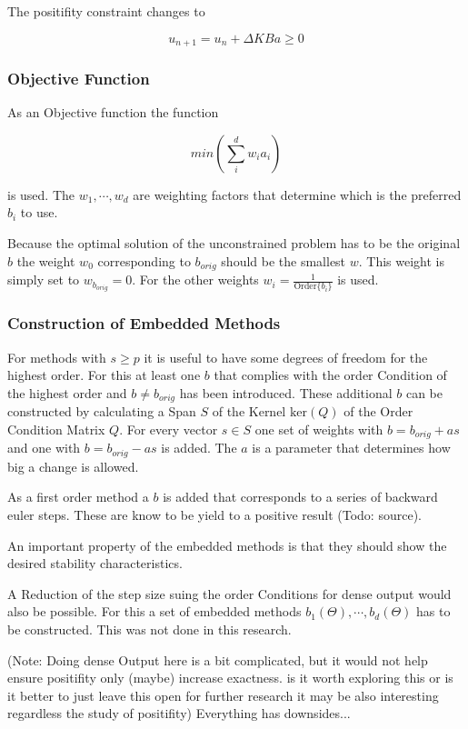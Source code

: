 \documentclass{article}
\begin{document}
The positifity constraint changes to 

$$u_{n+1}=u_n+\Delta K B a \geq 0$$


\subsubsection{Objective Function}

As an Objective function the function

$$ min \left(\sum_i^d w_i a_i \right) $$

is used.  The $w_1,\cdots,w_d$ are weighting factors that determine which is the preferred $b_i$ to use.

Because the optimal solution of the unconstrained problem has to be the original $b$ the weight $w_0$ corresponding to $b_{orig}$ should be the smallest $w$. This weight is simply set to $w_{b_{orig}} = 0$. For the other weights $w_i = \frac{1}{\mathrm{Order} \{b_i\}}$ is used.

\subsubsection{Construction of Embedded Methods}
For methods with $s \geq p$ it is useful to have some degrees of freedom for the highest order. For this at least one $b$ that complies with the order Condition of the highest order and $b \neq b_{orig}$ has been introduced.
These additional $b$ can be constructed by calculating a Span $S$ of the Kernel $\mathrm{ker} (Q)$ of the Order Condition Matrix $Q$. For every vector $s \in S$ one set of weights with $b = b_{orig} + a s$ and one with $b = b_{orig} - a s$ is added. The $a$ is a parameter that determines how big a change is allowed. 

As a first order method a $b$ is added that corresponds to a series of backward euler steps. These are know to be yield to a positive result (Todo: source).

An important property of the embedded methods is that they should show the desired stability characteristics.

A Reduction of the step size suing the order Conditions for dense output would also be possible. For this a set of embedded methods $b_1(\Theta),\cdots,b_d(\Theta)$ has to be constructed. This was not done in this research.

(Note: Doing dense Output here is a bit complicated, but it would not help ensure positifity only (maybe) increase exactness.  is it worth exploring this or is it better to just leave this open for further research it may be also interesting regardless the study of positifity)
Everything has downsides...
 
\end{document}
